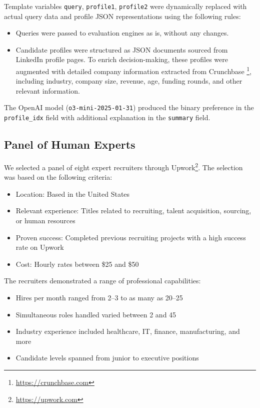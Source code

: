 \documentclass{article}
\begin{document}
Template variables \texttt{query}, \texttt{profile1}, \texttt{profile2} were dynamically replaced with actual query data and profile JSON representations using the following rules:

\begin{itemize}
  \item Queries were passed to evaluation engines as is, without any changes.
  \item Candidate profiles were structured as JSON documents sourced from LinkedIn profile pages. To enrich decision-making, these profiles were augmented with detailed company information extracted from Crunchbase \footnote{\url{https://crunchbase.com}}, including industry, company size, revenue, age, funding rounds, and other relevant information.
\end{itemize}

The OpenAI model (\texttt{o3-mini-2025-01-31}) produced the binary preference in the \texttt{profile\_idx} field with additional explanation in the \texttt{summary} field.


\subsection{Panel of Human Experts}

We selected a panel of eight expert recruiters through Upwork\footnote{\href{https://upwork.com}{https://upwork.com}}. The selection was based on the following criteria:
\begin{itemize}
    \item Location: Based in the United States
    \item Relevant experience: Titles related to recruiting, talent acquisition, sourcing, or human resources
    \item Proven success: Completed previous recruiting projects with a high success rate on Upwork
    \item Cost: Hourly rates between \$25 and \$50
\end{itemize}

The recruiters demonstrated a range of professional capabilities:
\begin{itemize}
    \item Hires per month ranged from 2--3 to as many as 20--25
    \item Simultaneous roles handled varied between 2 and 45
    \item Industry experience included healthcare, IT, finance, manufacturing, and more
    \item Candidate levels spanned from junior to executive positions
\end{itemize}
\end{document}
